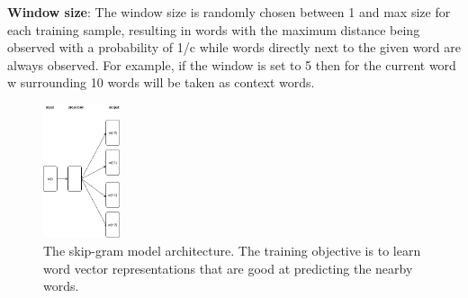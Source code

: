 \textbf{Window size}: The window size is randomly chosen between 1 and max size for each training sample, resulting in words with the maximum distance being observed with a probability of 1/c while words directly next to the given word are always observed. For example, if the window is set to 5 then for the current word w surrounding 10 words will be taken as context words.



\begin{figure}[t!]
	
	\includegraphics[width=0.20\textwidth]{skipgram}
	\caption{The skip-gram model architecture. The training objective is to learn word vector representations that are good at predicting the nearby words.}
	\label{fig:clf}
\end{figure}

